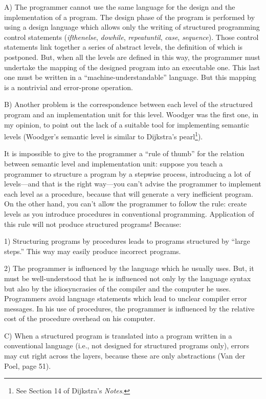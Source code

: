 \documentclass[openany,nobib]{tufte-book}
\begin{document}
A) The programmer cannot use the same language for the design and the
implementation of a program. The design phase of the program is performed by
using a design language which allows only the writing of structured programming
control statements ({\sl ifthenelse}, {\sl dowhile}, {\sl repeatuntil}, {\sl
case}, {\sl sequence}). Those control statements link together a series of
abstract levels, the definition of which is postponed. But, when all the levels
are defined in this way, the programmer must undertake the mapping of the
designed program into an executable one. This last one must be written in a
``machine-understandable'' language. But this mapping is a nontrivial and
error-prone operation.

B) Another problem is the correspondence between each level of the structured
program and an implementation unit for this level. Woodger was the first one,
in my opinion, to point out the lack of a suitable tool for implementing
semantic levels (Woodger's semantic level is similar to Dijkstra's
pearl\footnote{See Section 14 of Dijkstra's {\it Notes}.}).

It is impossible to give to the programmer a ``rule of thumb'' for the relation
between semantic level and implementation unit: suppose you teach a programmer
to structure a program by a stepwise process, introducing a lot of levels---and
that is the right way---you can't advise the programmer to implement each level
as a procedure, because that will generate a very inefficient
program.\autocite{horning1973process} On the other hand, you can't allow the
programmer to follow the rule: create levels as you introduce procedures in
conventional programming. Application of this rule will not produce structured
programs! Because:

1) Structuring programs by procedures leads to programs structured by ``large
steps.'' This way may easily produce incorrect
programs.\autocite{henderson1972experiment}

2) The programmer is influenced by the language which he usually
uses.\autocite{dijkstra1972humble} But, it must be well-understood that he is
influenced not only by the language syntax but also by the idiosyncrasies of
the compiler and the computer he uses. Programmers avoid language statements
which lead to unclear compiler error messages. In his use of procedures, the
programmer is influenced by the relative cost of the procedure overhead on his
computer.

C) When a structured program is translated into a program written in a
conventional language (i.e., not designed for structured programs only), errors
may cut right across the layers, because these are only abstractions (Van der
Poel,\autocite{naur1969software} page 51).
\end{document}
